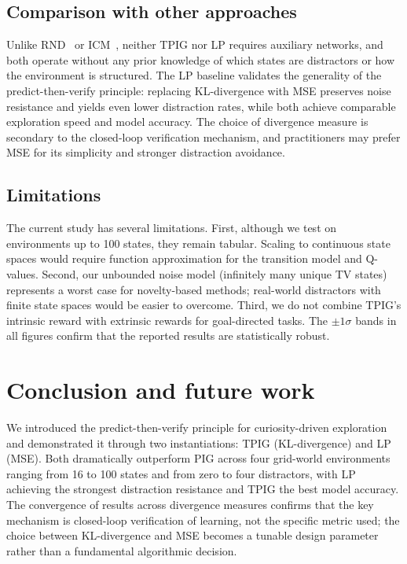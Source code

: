 \documentclass[letterpaper]{article}
\begin{document}
\subsection{Comparison with other approaches}

Unlike RND~\citep{Burda2019RND} or ICM~\citep{Pathak2017ICM},
neither TPIG nor LP requires auxiliary networks, and both operate
without any prior knowledge of which states are distractors or how
the environment is structured.  The LP baseline
validates the generality of the predict-then-verify principle:
replacing KL-divergence with MSE preserves noise resistance and yields
even lower distraction rates, while both achieve comparable
exploration speed and model accuracy.  The choice of divergence measure is secondary to the closed-loop
verification mechanism, and practitioners may prefer MSE for its
simplicity and stronger distraction avoidance.

\subsection{Limitations}

The current study has several limitations.  First, although we test
on environments up to 100 states, they remain tabular.  Scaling to
continuous state spaces would require function approximation for the
transition model and Q-values.  Second, our unbounded noise model (infinitely many unique TV states)
represents a worst case for novelty-based methods; real-world
distractors with finite state spaces would be easier to overcome.  Third, we do not combine TPIG's intrinsic reward with
extrinsic rewards for goal-directed tasks.  The $\pm 1\sigma$ bands in all
figures confirm that the reported results are statistically robust.

\section{Conclusion and future work}

We introduced the predict-then-verify principle for curiosity-driven
exploration and demonstrated it through two instantiations: TPIG
(KL-divergence) and LP (MSE).  Both dramatically outperform PIG across four grid-world environments
ranging from 16 to 100 states and from zero to four distractors,
with LP achieving the strongest distraction resistance and TPIG the
best model accuracy.  The convergence of results across divergence measures confirms that
the key mechanism is closed-loop verification of learning, not the
specific metric used; the choice between KL-divergence and MSE
becomes a tunable design parameter rather than a fundamental
algorithmic decision.
\end{document}
